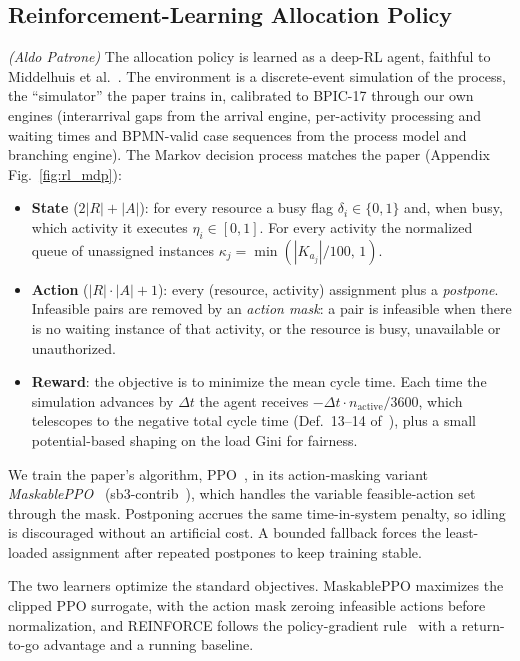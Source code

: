 \subsection{Reinforcement-Learning Allocation Policy}\label{subsec:rl}
\textit{(Aldo Patrone)}\quad
The allocation policy is learned as a deep-RL agent, faithful to Middelhuis et
al.~\cite{middelhuis2025rl}. The environment is a discrete-event simulation of the process, the ``simulator'' the paper trains in, calibrated to BPIC-17 through our own engines
(interarrival gaps from the arrival engine, per-activity processing and waiting times and
BPMN-valid case sequences from the process model and branching engine). The Markov decision
process matches the paper (Appendix Fig.~\ref{fig:rl_mdp}):

\begin{itemize}
  \item \textbf{State} ($2|R|+|A|$): for every resource a busy flag $\delta_i\in\{0,1\}$ and,
  when busy, which activity it executes $\eta_i\in[0,1]$. For every activity the normalized
  queue of unassigned instances $\kappa_j=\min(|K_{a_j}|/100,\,1)$.
  \item \textbf{Action} ($|R|\cdot|A|+1$): every (resource, activity) assignment plus a
  \emph{postpone}. Infeasible pairs are removed by an \emph{action mask}: a pair is infeasible
  when there is no waiting instance of that activity, or the resource is busy, unavailable or
  unauthorized.
  \item \textbf{Reward}: the objective is to minimize the mean cycle time. Each time the
  simulation advances by $\Delta t$ the agent receives $-\Delta t\cdot n_{\text{active}}/3600$,
  which telescopes to the negative total cycle time (Def.~13--14 of~\cite{middelhuis2025rl}),
  plus a small potential-based shaping on the load Gini for fairness.
\end{itemize}
We train the paper's algorithm, PPO~\cite{schulman2017ppo}, in its action-masking variant
\emph{MaskablePPO}~\cite{huang2022masking} (sb3-contrib~\cite{raffin2021sb3}), which handles the
variable feasible-action set through the mask. Postponing accrues the same time-in-system penalty, so
idling is discouraged without an artificial cost. A bounded fallback forces the least-loaded
assignment after repeated postpones to keep training stable.

The two learners optimize the standard objectives. MaskablePPO maximizes the clipped PPO surrogate,
with the action mask zeroing infeasible actions before normalization, and REINFORCE follows the
policy-gradient rule~\cite{williams1992reinforce, sutton2018rl} with a return-to-go advantage and a
running baseline.


